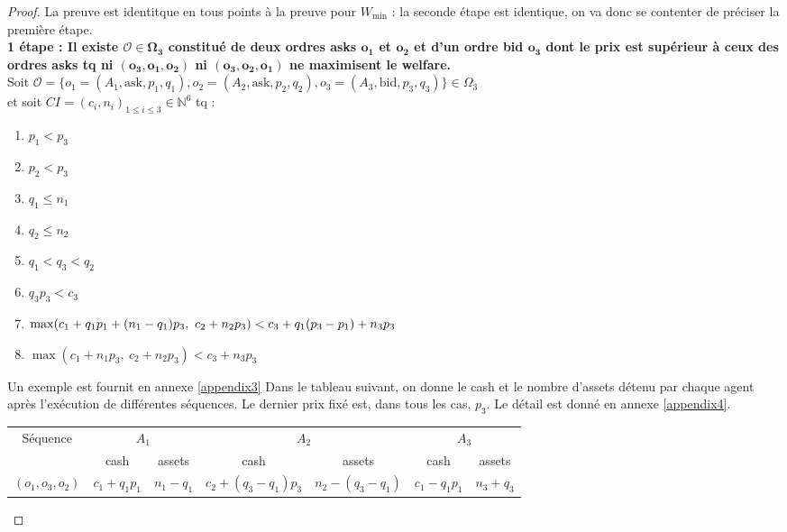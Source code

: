 \documentclass[a4paper]{article}
\newcommand{\N}{\mathbb{N}}
\newcommand{\Oc}{\mathcal{O}}
\newtheorem[style=S, bodystyle=\noindent]{thm}{Théorème}[section]
\newtheorem[style=S, bodystyle=\noindent]{defn}[thm]{Définition}
\newtheorem[style=S, bodystyle=\noindent]{propo}[thm]{Proposition}
\newtheorem[style=S, bodystyle=\noindent]{prop}[thm]{Propriété}
\newtheorem[style=S, bodystyle=\noindent]{coro}[thm]{Corollaire}
\newtheorem[style=S, bodystyle=\noindent]{lem}[thm]{Lemme}
\newtheorem[style=S, headstyle=\bfseries\boldmath Théorème, bodystyle=\noindent]{thm*}{Théorème}
\newtheorem[style=S, headstyle=\bfseries\boldmath Définition, bodystyle=\noindent]{defn*}{Définition}
\newtheorem[style=S, headstyle=\bfseries\boldmath Proposition, bodystyle=\noindent]{propo*}{Proposition}
\newtheorem[style=S, headstyle=\bfseries\boldmath Propriété, bodystyle=\noindent]{prop*}{Propriété}
\newtheorem[style=S, headstyle=\bfseries\boldmath Corollaire, bodystyle=\noindent]{coro*}{Corollaire}
\newtheorem[style=S, headstyle=\bfseries\boldmath Lemme, bodystyle=\noindent]{lem*}{Lemme}
\begin{document}
\begin{proof}
	La preuve est identitque en tous points à la preuve pour $W_{\min}$ : la seconde étape est identique, on va donc se contenter de préciser la première étape. \\
	\textbf{1 étape : Il existe $\boldsymbol{\Oc \in \Omega_3}$ constitué de deux ordres asks $\boldsymbol{o_1}$ et $\boldsymbol{o_2}$ et d'un ordre bid $\boldsymbol{o_3}$ dont le prix est supérieur à ceux des ordres asks tq ni $\boldsymbol{(o_3, o_1, o_2)}$ ni $\boldsymbol{(o_3, o_2, o_1)}$ ne maximisent le welfare.} \\
	Soit $\Oc = \{o_1 = (A_1, \text{ask}, p_1, q_1) , o_2 = (A_2, \text{ask}, p_2, q_2), o_3 = (A_3, \text{bid}, p_3, q_3)\} \in \Omega_3$ \\ et soit $CI = (c_i, n_i)_{1\leq i\leq 3} \in \N^6$ tq :
	\begin{multicols}{2}
	\begin{enumerate}
		\item $p_1 < p_3$
		\item $p_2 < p_3$
		\item $q_1 \leq n_1$
		\item $q_2 \leq n_2$\\
		\item $q_1 < q_3 < q_2$
		\item $q_3p_3 < c_3$
		\item $\max(c_1+q_1p_1+(n_1-q_1)p_3,~c_2+n_2p_3) \\ < c_3+q_1(p_3-p_1)+n_3p_3$
		\item $\max(c_1+n_1p_3,~c_2+n_2p_3) < c_3+n_3p_3$
	\end{enumerate}
	\end{multicols}
	Un exemple est fournit en annexe \ref{appendix3}
	Dans le tableau suivant, on donne le cash et le nombre d'assets détenu par chaque agent après l'exécution de différentes séquences. Le dernier prix fixé est, dans tous les cas, $p_3$. Le détail est donné en annexe \ref{appendix4}. \\
	\begin{center}
	\begin{tabular}{|c|c|c|c|c|c|c|}
		\hline
		\multirow{2}{*}{Séquence} & \multicolumn{2}{c|}{$A_1$} & \multicolumn{2}{c|}{$A_2$} & \multicolumn{2}{c|}{$A_3$} \\
		\cline{2-7}
		& cash & assets & cash & assets & cash & assets \\
		\hline
		\multirow{2}{*}{$(o_1, o_3, o_2)$} & \multirow{2}{*}{$c_1 + q_1p_1$} & \multirow{2}{*}{$n_1-q_1$} & \multirow{2}{*}{$c_2 + (q_3-q_1)p_3$} & \multirow{2}{*}{$n_2-(q_3-q_1)$} & $c_1 - q_1p_1$ & \multirow{2}{*}{$n_3+q_3$} \\

\end{tabular}
\end{center}
\end{proof}
\end{document}
